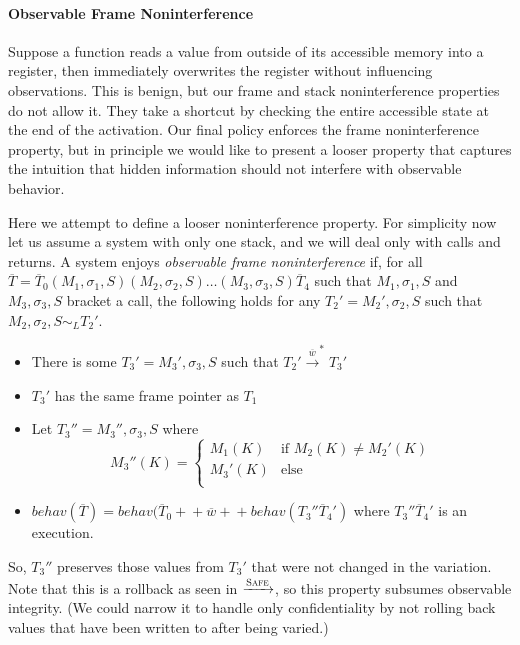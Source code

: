 \documentclass{article}
\begin{document}
    \paragraph{Observable Frame Noninterference}

      Suppose a function reads a value from outside of its accessible memory into
      a register, then immediately overwrites the register without influencing observations. This is benign,
      but our frame and stack noninterference properties do not allow it. They take a shortcut
      by checking the entire accessible state at the end of the activation. Our final policy enforces the
      frame noninterference property, but in principle we would like to present a looser property
      that captures the intuition that hidden information should not interfere with observable behavior.

      Here we attempt to define a looser noninterference property. For simplicity now let us assume a system with
      only one stack, and we will deal only with calls and returns.
      A system enjoys {\it observable frame noninterference} if, for all
      \(\overline{T} = \overline{T}_0 (M_1,\sigma_1,S) (M_2,\sigma_2,S) \dots (M_3,\sigma_3,S) \overline{T}_4\)
      such that \(M_1,\sigma_1,S\) and \(M_3,\sigma_3,S\) bracket a call, the following holds for any
      \(T_2' = M_2',\sigma_2,S\) such that \(M_2,\sigma_2,S \sim_L T_2'\).

      \begin{itemize}
        \item There is some \(T_3' = M_3',\sigma_3,S\) such that \(T_2' \xrightarrow{\overline{w}}^* T_3'\)
        \item \(T_3'\) has the same frame pointer as \(T_1\)
        \item Let \(T_3'' = M_3'', \sigma_3, S\) where
            \[M_3''(K) =
            \begin{cases}
              M_1(K) & \text{if } M_2(K) \not = M_2'(K) \\
              M_3'(K) & \text{else} \\
            \end{cases}\]
        \item \(\mathit{behav}(\overline{T}) = \mathit{behav}(\overline{T}_0 +\!\!\!+
          \overline{w} +\!\!\!+ \mathit{behav}(T_3'' \overline{T}_4')\) where \(T_3'' \overline{T}_4'\)
          is an execution.
      \end{itemize}
 
      So, \(T_3''\) preserves those values from \(T_3'\) that were not changed in the variation.
      Note that this is a rollback as seen in \(\xrightarrow{\text{\sc Safe}}\), so this property
      subsumes observable integrity. (We could narrow it to handle only confidentiality by not rolling
      back values that have been written to after being varied.)
\end{document}
